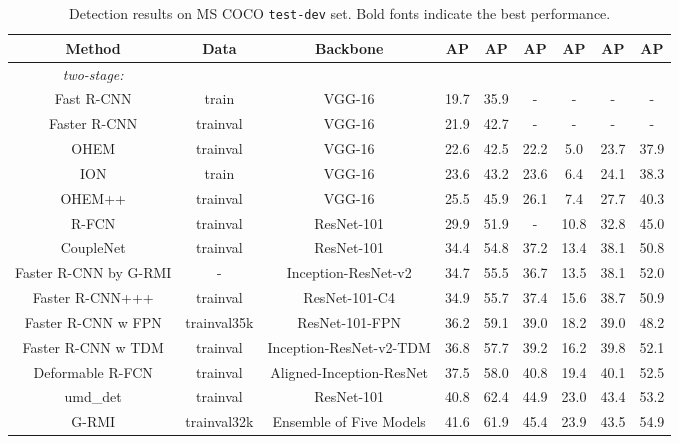 \documentclass[10pt,twocolumn,letterpaper]{article}
\begin{document}
\begin{table*}[t]
\centering
\caption{Detection results on MS COCO {\tt test-dev} set. Bold fonts indicate the best performance.}
\footnotesize \setlength{\tabcolsep}{9.5pt}
\begin{threeparttable}
\begin{tabular}{c|c|c|ccc|ccc}
\toprule[1.5pt]
Method &Data &Backbone &AP &AP &AP &AP &AP &AP\\
\hline
\textit{two-stage:} & & & & & & & & \\
Fast R-CNN \cite{DBLP:conf/iccv/Girshick15} &train &VGG-16 &19.7 &35.9 &- &- &- &- \\
Faster R-CNN \cite{DBLP:journals/pami/RenHG017} &trainval &VGG-16 &21.9 &42.7 &- &- &- &- \\
OHEM \cite{DBLP:conf/cvpr/ShrivastavaGG16} &trainval &VGG-16 &22.6 &42.5 &22.2 &5.0 &23.7 &37.9 \\
ION \cite{DBLP:conf/cvpr/BellZBG16} &train &VGG-16 &23.6 &43.2 &23.6 &6.4 &24.1 &38.3\\
OHEM++ \cite{DBLP:conf/cvpr/ShrivastavaGG16} &trainval &VGG-16 &25.5 &45.9 &26.1 &7.4 &27.7 &40.3 \\
R-FCN \cite{DBLP:conf/nips/DaiLHS16} &trainval &ResNet-101 &29.9 &51.9 &- &10.8 &32.8 &45.0\\
CoupleNet \cite{DBLP:conf/iccv/abs-1708-02863} &trainval &ResNet-101 &34.4 &54.8 &37.2 &13.4 &38.1 &50.8 \\
Faster R-CNN by G-RMI \cite{DBLP:conf/cvpr/HuangRSZKFFWSG016} &- &Inception-ResNet-v2\cite{DBLP:conf/aaai/SzegedyIVA17} &34.7 &55.5 &36.7 &13.5 &38.1 &52.0 \\
Faster R-CNN+++ \cite{DBLP:conf/cvpr/HeZRS16} &trainval &ResNet-101-C4 &34.9 &55.7 &37.4 &15.6 &38.7 &50.9\\
Faster R-CNN w FPN \cite{DBLP:conf/cvpr/LinDGHHB17} &trainval35k &ResNet-101-FPN &36.2 &59.1 &39.0 &18.2 &39.0 &48.2 \\
Faster R-CNN w TDM \cite{DBLP:journals/corr/ShrivastavaSMG16} &trainval &Inception-ResNet-v2-TDM &36.8 &57.7 &39.2 &16.2 &39.8 &52.1 \\
Deformable R-FCN \cite{DBLP:conf/iccv/DaiQXLZHW17} &trainval &Aligned-Inception-ResNet &37.5 &58.0 &40.8 &19.4 &40.1 &52.5 \\
umd\_det \cite{DBLP:conf/iccv/BodlaSCD17}                         &trainval      &ResNet-101     &40.8 &62.4 &44.9 &23.0 &43.4 &53.2 \\
G-RMI \cite{DBLP:conf/cvpr/HuangRSZKFFWSG016} &trainval32k &Ensemble of Five Models &41.6 &61.9 &45.4 &23.9 &43.5 &54.9 \\

\end{tabular}
\end{threeparttable}
\end{table*}
\end{document}
